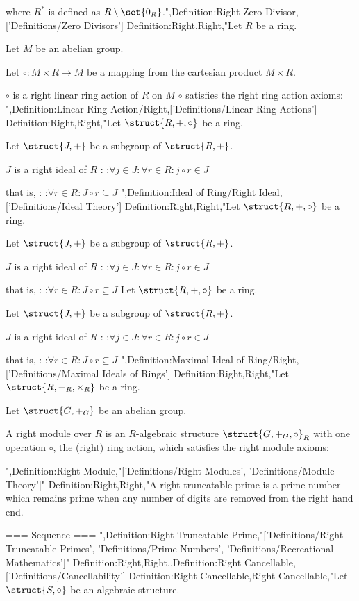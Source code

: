 where $R^*$ is defined as $R \setminus \set {0_R}$.",Definition:Right Zero Divisor,['Definitions/Zero Divisors']
Definition:Right,Right,"Let $R$ be a ring.

Let $M$ be an abelian group.

Let $\circ : M \times R \to M$ be a mapping from the cartesian product $M \times R$.


$\circ$ is a right linear ring action of $R$ on $M$  $\circ$ satisfies the right ring action axioms:
",Definition:Linear Ring Action/Right,['Definitions/Linear Ring Actions']
Definition:Right,Right,"Let $\struct {R, +, \circ}$ be a ring.

Let $\struct {J, +}$ be a subgroup of $\struct {R, +}$.


$J$ is a right ideal of $R$ :
:$\forall j \in J: \forall r \in R: j \circ r \in J$

that is, :
:$\forall r \in R: J \circ r \subseteq J$
",Definition:Ideal of Ring/Right Ideal,['Definitions/Ideal Theory']
Definition:Right,Right,"Let $\struct {R, +, \circ}$ be a ring.

Let $\struct {J, +}$ be a subgroup of $\struct {R, +}$.


$J$ is a right ideal of $R$ :
:$\forall j \in J: \forall r \in R: j \circ r \in J$

that is, :
:$\forall r \in R: J \circ r \subseteq J$
Let $\struct {R, +, \circ}$ be a ring.

Let $\struct {J, +}$ be a subgroup of $\struct {R, +}$.


$J$ is a right ideal of $R$ :
:$\forall j \in J: \forall r \in R: j \circ r \in J$

that is, :
:$\forall r \in R: J \circ r \subseteq J$
",Definition:Maximal Ideal of Ring/Right,['Definitions/Maximal Ideals of Rings']
Definition:Right,Right,"Let $\struct {R, +_R, \times_R}$ be a ring.

Let $\struct {G, +_G}$ be an abelian group.


A right module over $R$ is an $R$-algebraic structure $\struct {G, +_G, \circ}_R$ with one operation $\circ$, the (right) ring action, which satisfies the right module axioms:

",Definition:Right Module,"['Definitions/Right Modules', 'Definitions/Module Theory']"
Definition:Right,Right,"A right-truncatable prime is a prime number which remains prime when any number of digits are removed from the right hand end.


=== Sequence ===
",Definition:Right-Truncatable Prime,"['Definitions/Right-Truncatable Primes', 'Definitions/Prime Numbers', 'Definitions/Recreational Mathematics']"
Definition:Right,Right,,Definition:Right Cancellable,['Definitions/Cancellability']
Definition:Right Cancellable,Right Cancellable,"Let $\struct {S, \circ}$ be an algebraic structure.


